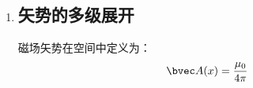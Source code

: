 \begin{enumerate}
\item \subsection{矢势的多级展开}
磁场矢势在空间中定义为：
\begin{equation}
\bvec A(x)=\dfrac {\mu_0}{4\pi}
\end{equation}

\end{enumerate}

